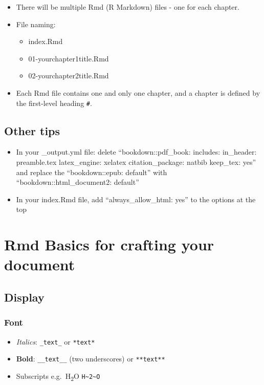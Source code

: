 \documentclass[
]{book}
\providecommand{\tightlist}{%
  \setlength{\itemsep}{0pt}\setlength{\parskip}{0pt}}
\begin{document}
\begin{itemize}
\tightlist
\item
  There will be multiple Rmd (R Markdown) files - one for each chapter.
\item
  File naming:

  \begin{itemize}
  \tightlist
  \item
    index.Rmd
  \item
    01-yourchapter1title.Rmd
  \item
    02-yourchapter2title.Rmd\\
  \end{itemize}
\item
  Each Rmd file contains one and only one chapter, and a chapter is defined by the first-level heading \texttt{\#}.
\end{itemize}

\hypertarget{other-tips}{%
\section{Other tips}\label{other-tips}}

\begin{itemize}
\item
  In your \_output.yml file: delete
  ``bookdown::pdf\_book:
  includes:
  in\_header: preamble.tex
  latex\_engine: xelatex
  citation\_package: natbib
  keep\_tex: yes'' and replace the
  ``bookdown::epub: default'' with
  ``bookdown::html\_document2: default''
\item
  In your index.Rmd file, add ``always\_allow\_html: yes'' to the options at the top
\end{itemize}

\hypertarget{RmdTools}{%
\chapter{Rmd Basics for crafting your document}\label{RmdTools}}

\hypertarget{display}{%
\section{Display}\label{display}}

\hypertarget{font}{%
\subsection{Font}\label{font}}

\begin{itemize}
\tightlist
\item
  \emph{Italics}: \texttt{\_text\_} or \texttt{*text*}
\item
  \textbf{Bold}: \texttt{\_\_text\_\_} (two underscores) or \texttt{**text**}
\item
  Subscripts e.g.~H\textsubscript{2}O \texttt{H\textasciitilde{}2\textasciitilde{}O}
\end{itemize}
\end{document}
